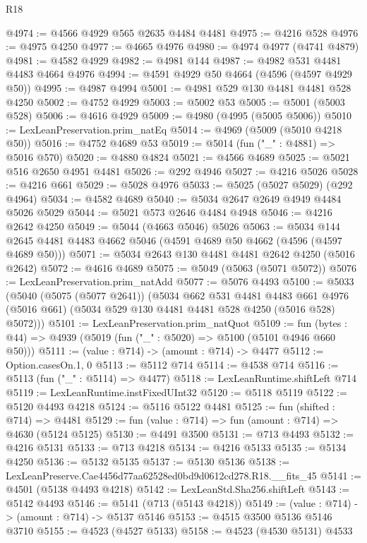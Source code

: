 \begin{lexlean}{R18}
\begin{coremodule}
@4974 := @4566 @4929 @565 @2635 @4484 @4481
@4975 := @4216 @528
@4976 := @4975 @4250
@4977 := @4665 @4976
@4980 := @4974 @4977 (@4741 @4879)
@4981 := @4582 @4929
@4982 := @4981 @144
@4987 := @4982 @531 @4481 @4483 @4664 @4976
@4994 := @4591 @4929 @50 @4664 (@4596 (@4597 @4929 @50))
@4995 := @4987 @4994
@5001 := @4981 @529 @130 @4481 @4481 @528 @4250
@5002 := @4752 @4929
@5003 := @5002 @53
@5005 := @5001 (@5003 @528)
@5006 := @4616 @4929
@5009 := @4980 (@4995 (@5005 @5006))
@5010 := LexLeanPreservation.prim_natEq
@5014 := @4969 (@5009 (@5010 @4218 @50))
@5016 := @4752 @4689 @53
@5019 := @5014 (fun ("_" : @4881) => @5016 @570)
@5020 := @4880 @4824
@5021 := @4566 @4689
@5025 := @5021 @516 @2650 @4951 @4481
@5026 := @292 @4946
@5027 := @4216 @5026
@5028 := @4216 @661
@5029 := @5028 @4976
@5033 := @5025 (@5027 @5029) (@292 @4964)
@5034 := @4582 @4689
@5040 := @5034 @2647 @2649 @4949 @4484 @5026 @5029
@5044 := @5021 @573 @2646 @4484 @4948
@5046 := @4216 @2642 @4250
@5049 := @5044 (@4663 @5046) @5026
@5063 := @5034 @144 @2645 @4481 @4483 @4662 @5046 (@4591 @4689 @50 @4662 (@4596 (@4597 @4689 @50)))
@5071 := @5034 @2643 @130 @4481 @4481 @2642 @4250 (@5016 @2642)
@5072 := @4616 @4689
@5075 := @5049 (@5063 (@5071 @5072))
@5076 := LexLeanPreservation.prim_natAdd
@5077 := @5076 @4493
@5100 := @5033
    (@5040
      (@5075 (@5077 @2641))
      (@5034
        @662
        @531
        @4481
        @4483
        @661
        @4976
        (@5016 @661)
        (@5034 @529 @130 @4481 @4481 @528 @4250 (@5016 @528) @5072)))
@5101 := LexLeanPreservation.prim_natQuot
@5109 := fun (bytes : @44) => @4939 (@5019 (fun ("_" : @5020) => @5100 (@5101 @4946 @660 @50)))
@5111 := (value : @714) -> (amount : @714) -> @4477
@5112 := Option.casesOn.{1, 0}
@5113 := @5112 @714
@5114 := @4538 @714
@5116 := @5113 (fun ("_" : @5114) => @4477)
@5118 := LexLeanRuntime.shiftLeft @714
@5119 := LexLeanRuntime.instFixedUInt32
@5120 := @5118 @5119
@5122 := @5120 @4493 @4218
@5124 := @5116 @5122 @4481
@5125 := fun (shifted : @714) => @4481
@5129 := fun (value : @714) => fun (amount : @714) => @4630 (@5124 @5125)
@5130 := @4491 @3500
@5131 := @713 @4493
@5132 := @4216 @5131
@5133 := @713 @4218
@5134 := @4216 @5133
@5135 := @5134 @4250
@5136 := @5132 @5135
@5137 := @5130 @5136
@5138 := LexLeanPreserve.Cae4456d77aa62528ed0bd9d0612cd278.R18.__fits_45
@5141 := @4501 (@5138 @4493 @4218)
@5142 := LexLeanStd.Sha256.shiftLeft
@5143 := @5142 @4493
@5146 := @5141 (@713 (@5143 @4218))
@5149 := (value : @714) -> (amount : @714) -> @5137 @5146
@5153 := @4515 @3500 @5136 @5146 @3710
@5155 := @4523 (@4527 @5133)
@5158 := @4523 (@4530 @5131) @4533

\end{coremodule}
\end{lexlean}
